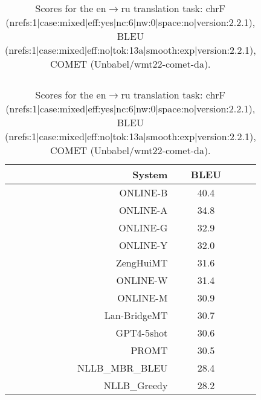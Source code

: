 \documentclass[11pt]{article}
\begin{document}
\begin{table}
\begin{subtable}[t]{0.33\textwidth}
\begin{tabular}{rcc}
\bottomrule 
\end{tabular} 
\end{subtable} 
\begin{subtable}[t]{0.33\textwidth}
\begin{tabular}{rcc}
\toprule 
System  & BLEU \\ 
\midrule 
\rowcolor{ashgrey} ONLINE-B  & 40.4 \\ 
\rowcolor{ashgrey} ONLINE-A  & 34.8 \\ 
\rowcolor{ashgrey} ONLINE-G  & 32.9 \\ 
\rowcolor{ashgrey} ONLINE-Y  & 32.0 \\ 
\rowcolor{ashgrey} ZengHuiMT  & 31.6 \\ 
\rowcolor{ashgrey} ONLINE-W  & 31.4 \\ 
\rowcolor{ashgrey} ONLINE-M  & 30.9 \\ 
\rowcolor{ashgrey} Lan-BridgeMT  & 30.7 \\ 
\rowcolor{ashgrey} GPT4-5shot  & 30.6 \\ 
\rowcolor{ashgrey} PROMT & 30.5 \\ 
\rowcolor{ashgrey} NLLB\_MBR\_BLEU  & 28.4 \\ 
\rowcolor{ashgrey} NLLB\_Greedy  & 28.2 \\ 
\bottomrule 
\end{tabular} 
\end{subtable}  
\caption{Scores for the en$\rightarrow$ru translation task: chrF (nrefs:1|case:mixed|eff:yes|nc:6|nw:0|space:no|version:2.2.1), BLEU (nrefs:1|case:mixed|eff:no|tok:13a|smooth:exp|version:2.2.1), COMET (Unbabel/wmt22-comet-da).} 
\end{table} 
\end{document}
